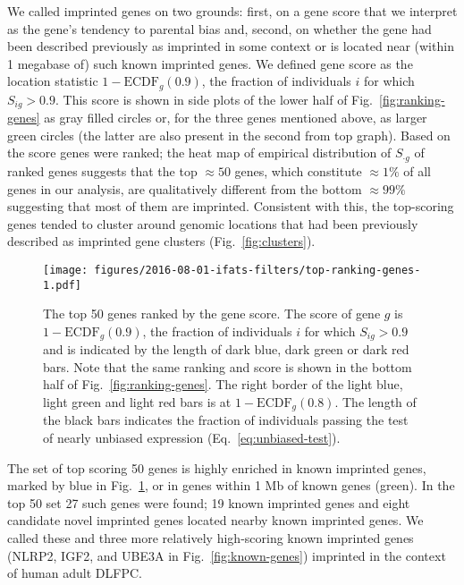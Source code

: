\documentclass[letterpaper]{article}
\begin{document}
We called imprinted genes on two grounds: first, on a gene score that we
interpret as the gene's tendency to parental bias and, second, on whether the
gene had been described previously as imprinted in some context or is located near (within 1
megabase of) such known imprinted genes.  We defined gene score as the
location statistic \(1 - \mathrm{ECDF}_g(0.9)\), the fraction of individuals
\(i\) for which \(S_{ig}>0.9\).  This score is shown in side plots of the
lower half of Fig.~\ref{fig:ranking-genes} as gray filled circles or, for the
three genes mentioned above, as larger green circles (the latter are also
present in the second from top graph).  Based on the score genes were ranked;
the heat map of empirical distribution of \(S_{\cdot g}\) of ranked genes
suggests that the top \(\approx 50\) genes, which constitute \(\approx 1\%\)
of all genes in our analysis, are qualitatively different from the bottom
\(\approx 99\%\) suggesting that most of them are imprinted.  Consistent with
this, the top-scoring genes tended to cluster around genomic locations that
had been previously described as imprinted gene clusters
(Fig.~\ref{fig:clusters}).

\begin{figure}
\begin{center}
\texttt{[image: figures/2016-08-01-ifats-filters/top-ranking-genes-1.pdf]}
\caption{
The top 50 genes ranked by the gene score.  The score of gene \(g\) is \(1 -
\mathrm{ECDF}_g(0.9)\), the fraction of individuals \(i\) for which
\(S_{ig}>0.9\) and is indicated by the length of dark blue, dark green or dark
red bars.  Note that the same ranking and score is shown in the bottom half of
Fig.~\ref{fig:ranking-genes}.  The right border of the light blue, light green
and light red bars is at \(1 - \mathrm{ECDF}_g(0.8)\).  The length of the
black bars indicates the fraction of individuals passing the test of nearly
unbiased expression (Eq.~\ref{eq:unbiased-test}).
}
\label{fig:top-genes}
\end{center}
\end{figure}

The set of top scoring 50 genes is highly enriched in known imprinted genes,
marked by blue in Fig.~\ref{fig:top-genes}, or in genes within 1 Mb of
known genes (green).  In the top 50 set 27 such genes were found; 19 known
imprinted genes and eight candidate novel imprinted genes located nearby known
imprinted genes.  We
called these and three more relatively high-scoring known imprinted genes (NLRP2,
IGF2, and UBE3A in Fig.~\ref{fig:known-genes}) imprinted in the context of
human adult DLFPC.
\end{document}
